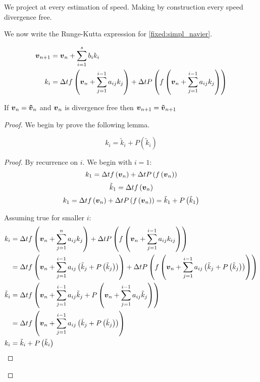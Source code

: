 We project at every estimation of speed. Making by construction every speed divergence free.

We now write the Runge-Kutta expression for \ref{fixed:simpl_navier}.

\begin{align}
	{\boldsymbol {v}}_{n+1}&={\boldsymbol {v}}_{n}+\sum_{i=1}^{s}b_{i}k_{i}\\
	k_{i}&=\Delta t f\left({\boldsymbol {v}}_{n}+\sum_{j=1}^{i-1}a_{ij}k_{j}\right)+\Delta t P\left(f\left({\boldsymbol {v}}_{n}+\sum_{j=1}^{i-1}a_{ij}k_{j}\right)\right)
\end{align}

\begin{thm}
If ${\boldsymbol {v}}_{n}={\boldsymbol {\tilde{v}}}_{n}$ and ${\boldsymbol {v}}_n$ is divergence free then ${\boldsymbol {v}}_{n+1}={\boldsymbol {\tilde{v}}}_{n+1}$ 
\end{thm}
\begin{proof}
We begin by prove the following lemma.
\begin{lem}
\begin{equation}
  k_{i}=\tilde{k}_{i}+P(\tilde{k}_{i})
\end{equation}
\end{lem}
\begin{proof}
By recurrence on $i$.
We begin with $i=1$:
\begin{equation}
  k_{1}=\Delta tf\left({\boldsymbol {v}}_n\right)+\Delta tP\left(f\left({\boldsymbol {v}}_n\right)\right)
\end{equation}
\begin{equation}
\tilde{k}_{1}=\Delta tf\left({\boldsymbol {v}}_n\right)
\end{equation}
\begin{equation}
  k_{1}=\Delta t f\left({\boldsymbol {v}}_n\right)+\Delta tP\left(f\left({\boldsymbol {v}}_n\right)\right)=\tilde{k}_1+P\left(\tilde{k}_1\right)
\end{equation}

Assuming true for smaller $i$:
\begin{align*}
  k_{i}&=\Delta tf\left({\boldsymbol {v}}_n+\sum_{j=1}^{n}a_{ij}k_{j}\right)+\Delta tP\left(f\left({\boldsymbol {v}}_n+\sum_{j=1}^{i-1}a_{ij}k_{ij}\right)\right)\\
  &=\Delta tf\left({\boldsymbol {v}}_n+\sum_{j=1}^{i-1}a_{ij}\left(\tilde{k}_{j}+P\left(\tilde{k}_{j}\right)\right)\right)+\Delta tP\left(f\left({\boldsymbol {v}}_n+\sum_{j=1}^{i-1}a_{ij}\left(\tilde{k}_{j}+P\left(\tilde{k}_{j}\right)\right)\right)\right)\\
  \tilde{k}_{i}&=\Delta tf\left({\boldsymbol {v}}_n+\sum_{j=1}^{i-1}a_{ij}\tilde{k}_{j}+P\left({\boldsymbol {v}}_n+\sum_{j=1}^{i-1}a_{ij}\tilde{k}_{j}\right)\right)\\
  &=\Delta tf\left({\boldsymbol {v}}_n+\sum_{j=1}^{i-1}a_{ij}\left(\tilde{k}_{j}+P\left(\tilde{k}_{j}\right)\right)\right)\\
  k_{i}&=\tilde{k}_{i}+P\left(\tilde{k}_{i}\right)
\end{align*}
\end{proof}


\end{proof}
